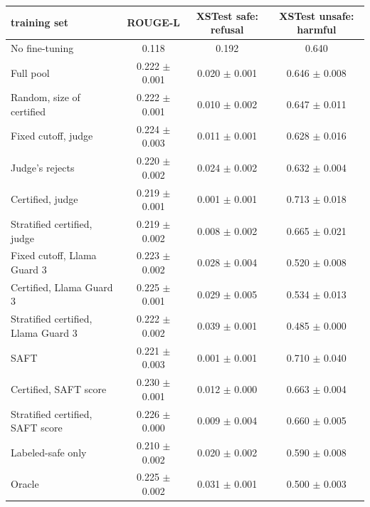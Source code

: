 \begin{tabular}{lccc}
\toprule
training set & ROUGE-L & XSTest safe: refusal & XSTest unsafe: harmful \\
\midrule
No fine-tuning & 0.118 & 0.192 & 0.640 \\
Full pool & 0.222 $\pm$ 0.001 & 0.020 $\pm$ 0.001 & 0.646 $\pm$ 0.008 \\
Random, size of certified & 0.222 $\pm$ 0.001 & 0.010 $\pm$ 0.002 & 0.647 $\pm$ 0.011 \\
Fixed cutoff, judge & 0.224 $\pm$ 0.003 & 0.011 $\pm$ 0.001 & 0.628 $\pm$ 0.016 \\
Judge's rejects & 0.220 $\pm$ 0.002 & 0.024 $\pm$ 0.002 & 0.632 $\pm$ 0.004 \\
Certified, judge & 0.219 $\pm$ 0.001 & 0.001 $\pm$ 0.001 & 0.713 $\pm$ 0.018 \\
Stratified certified, judge & 0.219 $\pm$ 0.002 & 0.008 $\pm$ 0.002 & 0.665 $\pm$ 0.021 \\
Fixed cutoff, Llama Guard 3 & 0.223 $\pm$ 0.002 & 0.028 $\pm$ 0.004 & 0.520 $\pm$ 0.008 \\
Certified, Llama Guard 3 & 0.225 $\pm$ 0.001 & 0.029 $\pm$ 0.005 & 0.534 $\pm$ 0.013 \\
Stratified certified, Llama Guard 3 & 0.222 $\pm$ 0.002 & 0.039 $\pm$ 0.001 & 0.485 $\pm$ 0.000 \\
SAFT & 0.221 $\pm$ 0.003 & 0.001 $\pm$ 0.001 & 0.710 $\pm$ 0.040 \\
Certified, SAFT score & 0.230 $\pm$ 0.001 & 0.012 $\pm$ 0.000 & 0.663 $\pm$ 0.004 \\
Stratified certified, SAFT score & 0.226 $\pm$ 0.000 & 0.009 $\pm$ 0.004 & 0.660 $\pm$ 0.005 \\
Labeled-safe only & 0.210 $\pm$ 0.002 & 0.020 $\pm$ 0.002 & 0.590 $\pm$ 0.008 \\
Oracle & 0.225 $\pm$ 0.002 & 0.031 $\pm$ 0.001 & 0.500 $\pm$ 0.003 \\
\bottomrule
\end{tabular}
